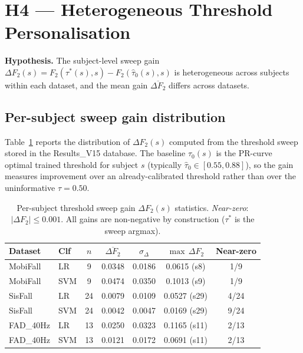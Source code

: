\documentclass[onluarkali,ingilizce,yukseklisans,karton,LisansustuEgitim]{itutez}
\providecommand{\1}{\mathbf{1}}
\begin{document}
\section{H4 — Heterogeneous Threshold Personalisation}
\label{subsec:H4}

\textbf{Hypothesis.}  The subject-level sweep gain
$\Delta F_2(s) = F_2(\tau^*(s),s) - F_2(\hat\tau_0(s),s)$
is heterogeneous across subjects within each dataset, and the mean gain
$\overline{\Delta F_2}$ differs across datasets.

\subsection{Per-subject sweep gain distribution}
\label{subsubsec:sweep-dist}

Table~\ref{tab:sweep-dist} reports the distribution of $\Delta F_2(s)$ computed from
the threshold sweep stored in the Results\_V15 database.  The baseline
$\hat\tau_0(s)$ is the PR-curve optimal trained threshold for subject $s$
(typically $\hat\tau_0\in[0.55,0.88]$), so the gain measures improvement over an
already-calibrated threshold rather than over the uninformative $\tau=0.50$.

\begin{table}[h!]
\centering
\caption{Per-subject threshold sweep gain $\Delta F_2(s)$ statistics.
  \emph{Near-zero}: $|\Delta F_2|\leq0.001$.
  All gains are non-negative by construction ($\tau^*$ is the sweep argmax).}
\label{tab:sweep-dist}
\small
\begin{tabular}{llccccc}
\toprule
\textbf{Dataset} & \textbf{Clf} & $n$ & $\overline{\Delta F_2}$ &
  $\sigma_{\Delta}$ & $\max\,\Delta F_2$ & Near-zero \\
\midrule
MobiFall   & LR  &  9 & 0.0348 & 0.0186 & 0.0615 (s8)  & 1/9  \\
MobiFall   & SVM &  9 & 0.0474 & 0.0350 & 0.1013 (s9)  & 1/9  \\
SisFall    & LR  & 24 & 0.0079 & 0.0109 & 0.0527 (s29) & 4/24 \\
SisFall    & SVM & 24 & 0.0042 & 0.0047 & 0.0169 (s29) & 9/24 \\
FAD\_40Hz  & LR  & 13 & 0.0250 & 0.0323 & 0.1165 (s11) & 2/13 \\
FAD\_40Hz  & SVM & 13 & 0.0121 & 0.0172 & 0.0691 (s11) & 2/13 \\
\bottomrule
\end{tabular}
\end{table}
\end{document}
